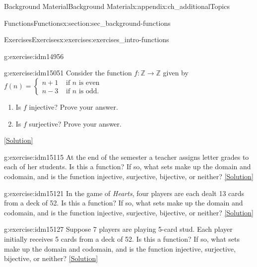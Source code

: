 \documentclass[oneside,10pt,]{book}
\numberwithin{equation}{chapter}
\def\Z{\mathbb Z}
\newcommand{\amp}{&}
\begin{document}
\begin{appendixptx}{Background Material}{}{Background Material}{}{}{x:appendix:ch_additionalTopics}
\begin{sectionptx}{Functions}{}{Functions}{}{}{x:section:sec_background-functions}
\begin{exercises-subsection}{Exercises}{}{Exercises}{}{}{x:exercises:exercises_intro-functions}
\begin{divisionexercise}{13}{}{}{g:exercise:idm14956}
\end{divisionexercise}%
\begin{divisionexercise}{14}{}{}{g:exercise:idm15051}%
Consider the function \(f:\Z \to \Z\) given by \(f(n) = \begin{cases}n+1 \amp  \text{ if }n\text{ is even} \\ n-3 \amp \text{ if }n\text{ is odd} . \end{cases}\)%
\begin{enumerate}[label=(\alph*)]
\item{}Is \(f\) injective? Prove your answer.%
\item{}Is \(f\) surjective? Prove your answer.%
\end{enumerate}
%
\space\hspace*{0pt}\hfill{\tiny\hyperlink{g:solution:idm15063-main}{[Solution]}}\end{divisionexercise}%
\begin{divisionexercise}{15}{}{}{g:exercise:idm15115}%
At the end of the semester a teacher assigns letter grades to each of her students. Is this a function? If so, what sets make up the domain and codomain, and is the function injective, surjective, bijective, or neither?%
\space\hspace*{0pt}\hfill{\tiny\hyperlink{g:solution:idm15118-main}{[Solution]}}\end{divisionexercise}%
\begin{divisionexercise}{16}{}{}{g:exercise:idm15121}%
In the game of \emph{Hearts}, four players are each dealt 13 cards from a deck of 52. Is this a function? If so, what sets make up the domain and codomain, and is the function injective, surjective, bijective, or neither?%
\space\hspace*{0pt}\hfill{\tiny\hyperlink{g:solution:idm15125-main}{[Solution]}}\end{divisionexercise}%
\begin{divisionexercise}{17}{}{}{g:exercise:idm15127}%
Suppose 7 players are playing 5-card stud. Each player initially receives 5 cards from a deck of 52. Is this a function? If so, what sets make up the domain and codomain, and is the function injective, surjective, bijective, or neither?%
\space\hspace*{0pt}\hfill{\tiny\hyperlink{g:solution:idm15130-main}{[Solution]}}\end{divisionexercise}%
\end{exercises-subsection}
\end{sectionptx}
%
%
\typeout{************************************************}

\end{appendixptx}
\end{document}
